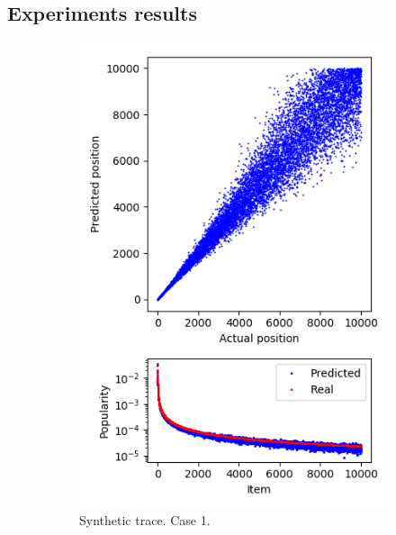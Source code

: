 \subsection{Experiments results} \label{experiments_results}

\begin{figure}[b!]
	\centering
	\begin{subfigure}[b]{0.49\linewidth}
		\includegraphics[width=\linewidth]{pics/case1_op.png}
		\caption{Synthetic trace. Case 1.}
	\end{subfigure}
	\begin{subfigure}[b]{0.49\linewidth}

\end{subfigure}
\end{figure}
